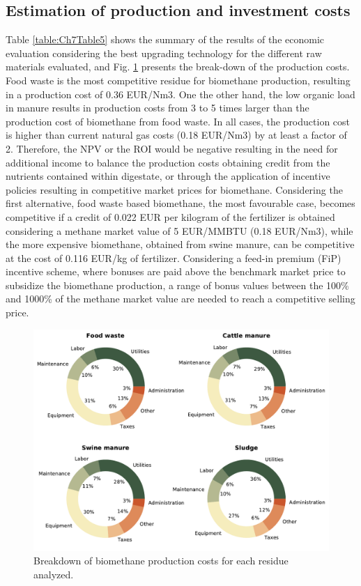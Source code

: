 \begin{refsection}[referencesCh7]
\subsection{Estimation of production and investment costs}
Table \ref{table:Ch7Table5} shows the summary of the results of the economic evaluation considering the best upgrading technology for the different raw materials evaluated, and Fig. \ref{fig:Ch7Fig3} presents the break-down of the production costs. Food waste is the most competitive residue for biomethane production, resulting in a production cost of 0.36 EUR/Nm3. One the other hand, the low organic load in manure results in production costs from 3 to 5 times larger than the production cost of biomethane from food waste. In all cases, the production cost is higher than current natural gas costs (0.18 EUR/Nm3) \citep{EIAPrices} by at least a factor of 2. Therefore, the NPV or the ROI would be negative resulting in the need for additional income to balance the production costs obtaining credit from the nutrients contained within digestate, or through the application of incentive policies resulting in competitive market prices for biomethane. Considering the first alternative, food waste based biomethane, the most favourable case, becomes competitive if a credit of 0.022 EUR per kilogram of the fertilizer is obtained considering a methane market value of 5 EUR/MMBTU (0.18 EUR/Nm3), while the more expensive biomethane, obtained from swine manure, can be competitive at the cost of 0.116 EUR/kg of fertilizer. Considering a feed-in premium (FiP) incentive scheme, where bonuses are paid above the benchmark market price to subsidize the biomethane production, a range of bonus values between the 100\% and 1000\% of the methane market value are needed to reach a competitive selling price.

\begin{figure}[h]
	\centering
	\includegraphics[width=1\linewidth, trim={0cm 0cm 0cm 0cm},clip]{gfx/Chapter7/Figure3.pdf} 
	\caption{Breakdown of biomethane production costs for each residue analyzed.}
	\label{fig:Ch7Fig3}
\end{figure}


\end{refsection}
